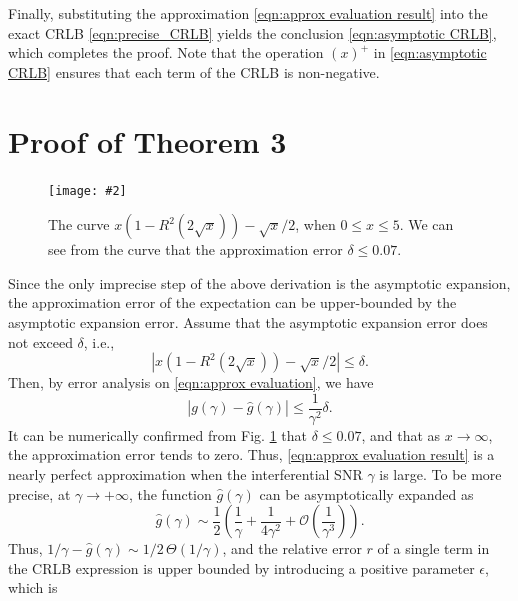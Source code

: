 \documentclass[journal,twocolumn]{IEEEtran}
\theoremstyle{nonumberplain}
\newcommand{\myincludegraphics}[2][width=1\linewidth]{\texttt{[image: \#2]}}
\newcommand{\myincludegraphics}[2][width=0.8\linewidth]{\texttt{[image: \#2]}}
\begin{document}
    Finally, substituting the approximation \eqref{eqn:approx evaluation result} into the exact CRLB \eqref{eqn:precise_CRLB} yields the conclusion \eqref{eqn:asymptotic CRLB}, which completes the proof. Note that the operation $(x)^+$ in \eqref{eqn:asymptotic CRLB} ensures that each term of the CRLB is non-negative. 

\section{Proof of \textbf{Theorem 3}}
\label{Proof of Theorem 3}
    \begin{figure}[t]
        \centering
        \myincludegraphics{figures/asymptotic_expansion.pdf}
        \caption{The curve $x(1-R^2(2\sqrt{x}))-\sqrt{x}/2$, when $0\leq x\leq 5$. We can see from the curve that the approximation error $\delta \leq 0.07$.}
        \label{fig:asymptotic_expansion}
    \end{figure}
    Since the only imprecise step of the above derivation is the asymptotic expansion, the approximation error of the expectation can be upper-bounded by the asymptotic expansion error. Assume that the asymptotic expansion error does not exceed $\delta$, i.e.,
    \begin{equation}
        \left\vert x\left(1-R^2(2\sqrt{x})\right)-\sqrt{x}/2 \right\vert \leq \delta.
        \label{eqn:asymptotic error}
    \end{equation}
    Then, by error analysis on \eqref{eqn:approx evaluation}, we have 
    \begin{equation}
        \left| g(\gamma) - \hat{g}(\gamma)\right| \leq \frac{1}{\gamma^2} \delta. 
    \end{equation}
    It can be numerically confirmed from Fig. \ref{fig:asymptotic_expansion} that $\delta \leq 0.07$, and that as $x\to \infty$, the approximation error tends to zero. Thus, \eqref{eqn:approx evaluation result} is a nearly perfect approximation when the interferential SNR $\gamma$ is large. To be more precise, at $\gamma \to +\infty$, the function $\hat{g}(\gamma)$ can be asymptotically expanded as
    \begin{equation}
        \hat{g}(\gamma) \sim \frac{1}{2}\left(\frac{1}{\gamma} + \frac{1}{4\gamma^2} + \mathcal O(\frac{1}{\gamma^3})\right).
        \label{eqn:g hat asymptotic expansion}
    \end{equation}
    Thus, $1/\gamma - \hat{g}(\gamma) \sim 1/2\,\Theta (1/\gamma)$, and the relative error $r$ of a single term in the CRLB expression is upper bounded by introducing a positive parameter $\epsilon$, which is
\end{document}
